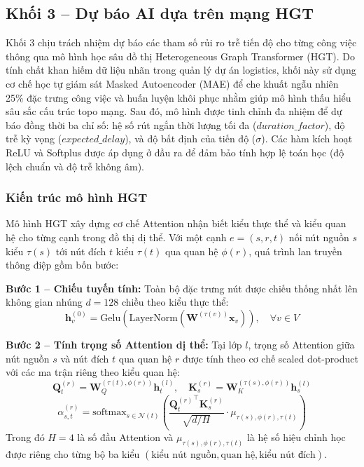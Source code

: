 \subsection{Khối 3 -- Dự báo AI dựa trên mạng HGT}
Khối 3 chịu trách nhiệm dự báo các tham số rủi ro trễ tiến độ cho từng công việc thông qua mô hình học sâu đồ thị Heterogeneous Graph Transformer (HGT). Do tính chất khan hiếm dữ liệu nhãn trong quản lý dự án logistics, khối này sử dụng cơ chế học tự giám sát Masked Autoencoder (MAE) để che khuất ngẫu nhiên 25\% đặc trưng công việc và huấn luyện khôi phục nhằm giúp mô hình thấu hiểu sâu sắc cấu trúc topo mạng. Sau đó, mô hình được tinh chỉnh đa nhiệm để dự báo đồng thời ba chỉ số: hệ số rút ngắn thời lượng tối đa ($duration\_factor$), độ trễ kỳ vọng ($expected\_delay$), và độ bất định của tiến độ ($\sigma$). Các hàm kích hoạt ReLU và Softplus được áp dụng ở đầu ra để đảm bảo tính hợp lệ toán học (độ lệch chuẩn và độ trễ không âm).

\subsubsection{Kiến trúc mô hình HGT}
Mô hình HGT xây dựng cơ chế Attention nhận biết kiểu thực thể và kiểu quan hệ cho từng cạnh trong đồ thị dị thể. Với một cạnh $e = (s, r, t)$ nối nút nguồn $s$ kiểu $\tau(s)$ tới nút đích $t$ kiểu $\tau(t)$ qua quan hệ $\phi(r)$, quá trình lan truyền thông điệp gồm bốn bước:

\textbf{Bước 1 -- Chiếu tuyến tính:} Toàn bộ đặc trưng nút được chiếu thống nhất lên không gian nhúng $d = 128$ chiều theo kiểu thực thể:
$$\mathbf{h}_v^{(0)} = \text{Gelu}\!\left(\text{LayerNorm}\!\left(\mathbf{W}^{(\tau(v))} \mathbf{x}_v\right)\right), \quad \forall v \in V$$

\textbf{Bước 2 -- Tính trọng số Attention dị thể:} Tại lớp $l$, trọng số Attention giữa nút nguồn $s$ và nút đích $t$ qua quan hệ $r$ được tính theo cơ chế scaled dot-product với các ma trận riêng theo kiểu quan hệ:
$$\mathbf{Q}_t^{(r)} = \mathbf{W}_Q^{(\tau(t), \phi(r))} \mathbf{h}_t^{(l)}, \quad \mathbf{K}_s^{(r)} = \mathbf{W}_K^{(\tau(s), \phi(r))} \mathbf{h}_s^{(l)}$$
$$\alpha_{s,t}^{(r)} = \mathrm{softmax}_{s \in \mathcal{N}(t)} \!\left( \frac{{\mathbf{Q}_t^{(r)}}^\top \mathbf{K}_s^{(r)}}{\sqrt{d/H}} \cdot \mu_{\tau(s), \phi(r), \tau(t)} \right)$$
Trong đó $H = 4$ là số đầu Attention và $\mu_{\tau(s), \phi(r), \tau(t)}$ là hệ số hiệu chỉnh học được riêng cho từng bộ ba kiểu $(\text{kiểu nút nguồn}, \text{quan hệ}, \text{kiểu nút đích})$.

